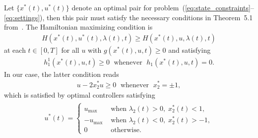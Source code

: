 \documentclass[a4paper]{article}
\theoremstyle{definition}
\theoremstyle{plain}
\begin{document}
Let $\{ x^{*}(t), u^{*}(t) \}$ denote an optimal pair for
problem~(\ref{eq:state_constraints}--\ref{eq:settings}), then this pair must
satisfy the necessary conditions in Theorem~5.1
from~\cite{hartlSurveyMaximumPrinciples1995}.
%
The Hamiltonian maximizing condition is
\begin{align*}
  H(x^{*}(t), u^{*}(t), \lambda(t), t) \geq H(x^{*}(t), u, \lambda(t), t)
\end{align*}
at each $t \in [0, T]$ for all $u$ with $g(x^{*}(t), u, t) \geq 0$ and satisfying
\begin{align*}
  h_{1}^{1}(x^{*}(t),u,t) \geq 0 \; \text{ whenever } \; h_{1}(x^{*}(t),u,t) = 0 .
\end{align*}
%
In our case, the latter condition reads
\begin{align*}
  u - 2x^{*}_{2}u \geq 0 \; \text{ whenever } \; x_{2}^{*} = \pm 1 ,
\end{align*}
%
which is satisfied by optimal controllers satisfying
\begin{align}
  \label{eq:optimal_u}
  \begin{split}
  u^{*}(t) =
  \begin{cases}
  u_{\max} &\text{ when } \lambda_{2}(t) > 0, \; x^{*}_{2}(t) < 1 , \\
  -u_{\max} &\text{ when } \lambda_{2}(t) < 0, \; x^{*}_{2}(t) > - 1 , \\
  0 &\text{ otherwise. }
  \end{cases}
  \end{split}
\end{align}
\end{document}
